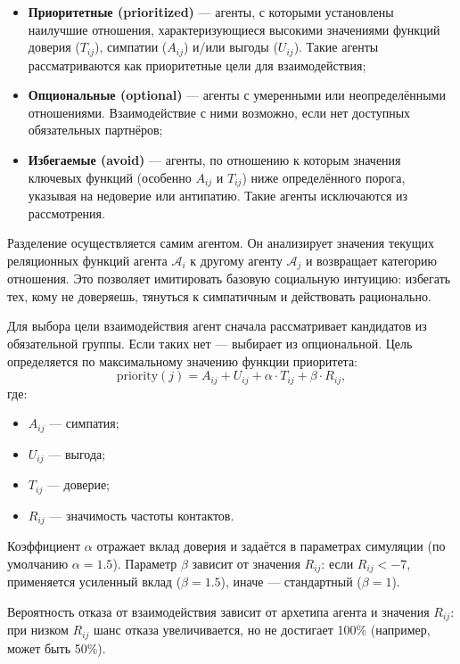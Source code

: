 \documentclass[12pt]{article}
\begin{document}
\begin{itemize}
    \item \textbf{Приоритетные (prioritized)} — агенты, с которыми установлены наилучшие отношения, характеризующиеся высокими значениями функций доверия (\( T_{ij} \)), симпатии (\( A_{ij} \)) и/или выгоды (\( U_{ij} \)). Такие агенты рассматриваются как приоритетные цели для взаимодействия;
    \item \textbf{Опциональные (optional)} — агенты с умеренными или неопределёнными отношениями. Взаимодействие с ними возможно, если нет доступных обязательных партнёров;
    \item \textbf{Избегаемые (avoid)} — агенты, по отношению к которым значения ключевых функций (особенно \( A_{ij} \) и \( T_{ij} \)) ниже определённого порога, указывая на недоверие или антипатию. Такие агенты исключаются из рассмотрения.
\end{itemize}

Разделение осуществляется самим агентом. Он анализирует значения текущих реляционных функций агента \( \mathcal{A}_i \) к другому агенту \( \mathcal{A}_j \) и возвращает категорию отношения. Это позволяет имитировать базовую социальную интуицию: избегать тех, кому не доверяешь, тянуться к симпатичным и действовать рационально.

Для выбора цели взаимодействия агент сначала рассматривает кандидатов из обязательной группы.
Если таких нет — выбирает из опциональной.
Цель определяется по максимальному значению функции приоритета:
\[
\text{priority}(j) = A_{ij} + U_{ij} + \alpha \cdot T_{ij} + \beta \cdot R_{ij},
\]
где:
\begin{itemize}
    \item \(A_{ij}\) — симпатия;
    \item \(U_{ij}\) — выгода;
    \item \(T_{ij}\) — доверие;
    \item \(R_{ij}\) — значимость частоты контактов.
\end{itemize}

Коэффициент \(\alpha\) отражает вклад доверия и задаётся в параметрах симуляции (по умолчанию \(\alpha = 1.5\)).
Параметр \(\beta\) зависит от значения \(R_{ij}\): если \(R_{ij} < -7\), применяется усиленный вклад (\(\beta = 1.5\)), иначе — стандартный (\(\beta = 1\)).

Вероятность отказа от взаимодействия зависит от архетипа агента и значения \(R_{ij}\): при низком \(R_{ij}\) шанс отказа увеличивается, но не достигает 100\% (например, может быть 50\%).
\end{document}
